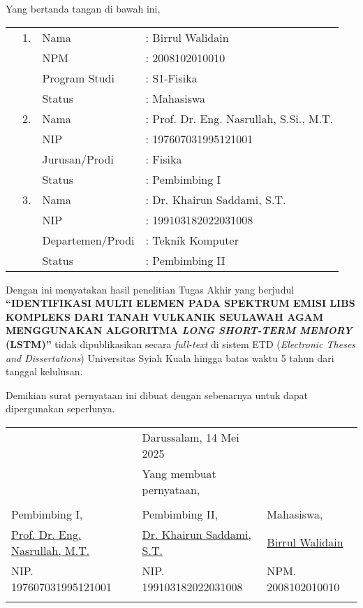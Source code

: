 \spernyataan %

\noindent
Yang bertanda tangan di bawah ini,
\vspace{-0.1cm}
\begin{table}[H]
{\renewcommand{\arraystretch}{0.7}
\begin{tabular}{M{0.6cm}lll}
	&1. 	& Nama   		&: Birrul Walidain \\
	&	& NPM       			&: 2008102010010   \\
	&	& Program Studi  		&: S1-Fisika \\
	&	& Status 				&: Mahasiswa \\  
	&2. 	& Nama  		&: Prof. Dr. Eng. Nasrullah, S.Si., M.T. \\
	&	& NIP       			&: 197607031995121001   \\
	&	& Jurusan/Prodi   		&: Fisika \\
	&	& Status 				&: Pembimbing I \\  
	&3. 	& Nama  		&: Dr. Khairun Saddami, S.T. \\
	&	& NIP       			&: 199103182022031008   \\
	&	& Departemen/Prodi   		&: Teknik Komputer \\
	&	& Status 				&: Pembimbing II   
\end{tabular}
}
\end{table}
\onehalfspacing
\vspace{-0.4cm}
\noindent
Dengan ini menyatakan hasil penelitian Tugas Akhir yang berjudul \textbf{“IDENTIFIKASI MULTI ELEMEN PADA SPEKTRUM EMISI LIBS KOMPLEKS DARI 
TANAH VULKANIK SEULAWAH AGAM MENGGUNAKAN ALGORITMA 
\textit{LONG SHORT-TERM MEMORY} (LSTM)”} tidak dipublikasikan secara \textit{full-text} di sistem ETD (\textit{Electronic Theses and Dissertations}) Universitas Syiah Kuala hingga batas waktu 5 tahun dari tanggal kelulusan.

\vspace{0.4cm}
\noindent
Demikian surat pernyataan ini dibuat dengan sebenarnya untuk dapat dipergunakan seperlunya.

\vspace{0.4cm}
{\renewcommand{\arraystretch}{0.8}
\centering
\begin{tabular}{lll}
	&Darussalam, 14 Mei 2025		& \\
	&Yang membuat pernyataan,			& \\
	&&\\
	Pembimbing I,							&Pembimbing II,							&Mahasiswa,\\
	[1.5cm]
	\underline{Prof. Dr. Eng. Nasrullah, M.T.}	&\underline{Dr. Khairun Saddami, S.T.} &\underline{Birrul Walidain}\\
	NIP. 197607031995121001				&NIP. 199103182022031008				&NPM. 2008102010010\\
	&&\\

\end{tabular}
}

